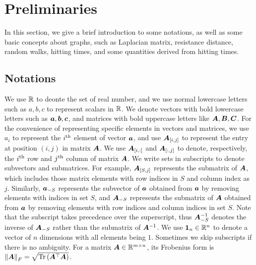 \documentclass[10pt,twocolumn,twoside]{IEEEtran}
\begin{document}
\section{Preliminaries}

In this section, we give a brief introduction to some notations, as well as some basic concepts about graphs, such as Laplacian matrix, resistance distance, random walks, hitting times, and some quantities derived from hitting times.

\subsection{Notations}

We use  \(\mathbb{R}\) to deonte the set of real number, and we use normal lowercase letters such as \(a,b,c\) to represent scalars in \(\mathbb{R}\). We denote vectors with bold lowercase letters such as \(\boldsymbol{a},\boldsymbol{b},\boldsymbol{c}\), and matrices with bold uppercase letters like \(\boldsymbol{A},\boldsymbol{B},\boldsymbol{C}\). For the convenience of representing specific elements in vectors and matrices, we use \(a_{i}\) to represent the \({i}^{\rm{th}}\) element of vector \(\boldsymbol{a}\), and use \(\boldsymbol{A}_{[i,j]}\) to represent the entry at position \((i,j)\) in matrix \(\boldsymbol{A}\). We use \(\boldsymbol{A}_{[i,:]}\) and \(\boldsymbol{A}_{[:,j]}\) to denote, respectively, the \({i}^{\rm{th}}\) row and \({j}^{\rm{th}}\) column of matrix \(\boldsymbol{A}\). We write sets in subscripts to denote subvectors and submatrices.
For example, \(\boldsymbol{A}_{[S,j]}\) represents the submatrix of \(\boldsymbol{A}\), which includes those matrix elements with row indices in \(S\) and column index as \(j\). Similarly, \(\boldsymbol{a}_{-S}\) represents the subvector of \(\boldsymbol{a}\) obtained from  \(\boldsymbol{a}\) by removing elements with indices in set \(S\), and \(\boldsymbol{A}_{-S}\) represents the submatrix of \(\boldsymbol{A}\) obtained  from  \(\boldsymbol{a}\) by removing elements with row indices and column indices in set \(S\).
Note that the subscript takes precedence over the superscript, thus \(\boldsymbol{A}_{-S}^{-1}\) denotes the inverse of \(\boldsymbol{A}_{-S}\) rather than the submatrix of \(\boldsymbol{A}^{-1}\). We use  \(\boldsymbol{1}_n\in \mathbb{R}^n\) to denote a vector of \(n\) dimensions with all elements being \(1\). Sometimes we skip subscripts if there is no ambiguity. For a matrix \(\boldsymbol{A}\in\mathbb{R}^{m\times n}\), its Frobenius form is \(\left\Vert\boldsymbol{A}\right\Vert_F=\sqrt{\mathrm{Tr}\left(\boldsymbol{A}^\top\boldsymbol{A}\right)}\).

\end{document}

